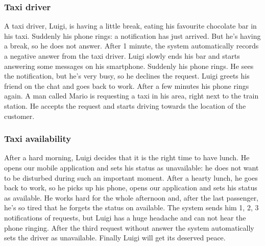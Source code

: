 		\subsubsection{Taxi driver}
			A taxi driver, Luigi, is having a little break, eating his favourite chocolate bar in his taxi. Suddenly
			his phone rings: a notification has just arrived. But he's having a break, so he does not answer.
			After 1 minute, the system automatically records a negative answer from the taxi driver.
			Luigi slowly ends his bar and starts answering some messages on his smartphone. Suddenly his phone
			rings. He sees the notification, but he's very busy, so he declines the request. Luigi greets his
			friend on the chat and goes back to work. After a few minutes his phone rings again. A man called
			Mario is requesting a taxi in his area, right next to the train station. He accepts the request and
			starts driving towards the location of the customer.
		\subsubsection{Taxi availability}
			After a hard morning, Luigi decides that it is the right time to have lunch. He opens our mobile
			application and sets his status as unavailable: he does not want to be disturbed during such an
			important moment. After a hearty lunch, he goes back to work, so he picks up his phone, opens our
			application and sets his status as available. He works hard for the whole afternoon and, after the
			last passenger, he's so tired that he forgets the status on available. The system sends him 1, 2, 3
			notifications of requests, but Luigi has a huge headache and can not hear the phone ringing. After
			the third request without answer the system automatically sets the driver as unavailable.
			Finally Luigi will get its deserved peace.